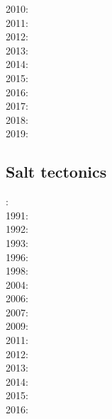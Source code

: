 2010: \cite{aubh10}\cite{gery10}\cite{fosr10}\cite{gerya2010}\\
2011: \cite{alht11}\cite{ellw11}\cite{hube11}\\
2012: \cite{alht12}\cite{brps12}\\
2013: \cite{alhf13}\cite{brau13}\cite{chbe13}\cite{knak13}\cite{kern13}\cite{mipf13}\cite{wabd13}
      \cite{gery13}\cite{ligw13}\cite{gery13c}\\
2014: \cite{hebr14}\cite{lige14}\cite{brun14}\cite{kobf14}\cite{ebva14}\cite{puge14}\cite{lige14b}
      \cite{hube14}\\
2015: \cite{nabu15}\cite{clbq15}\cite{huyb15}\cite{shmj15}\\
2016: \cite{olbm16}\cite{jekm16}\cite{zwsn16}\\
2017: \cite{lemh17}\cite{brcr17}\cite{bekb17}\cite{nabp17}\\
2018: \cite{chsm18}\cite{brwm18}\cite{brun18}\cite{tebu18}\cite{jebu18}\cite{sahf18}\cite{pesn18}
      \cite{mord18}\\
2019: \cite{lisp19}\cite{zwsb19}\cite{anpa19}\cite{dual19}\cite{mocb19}

\subsection*{Salt tectonics}

: \cite{woid78}\\
1991: \cite{tars91}\\
1992: \cite{zaju92}\\
1993: \cite{nabr93}\cite{vasv93}\cite{wejv93}\\
1996: \cite{maar96}\\
1998: \cite{giju98}\\
2004: \cite{istt04}\cite{geim04}\\
2006: \cite{maqs07}\\
2007: \cite{huja07}\cite{maqs07}\\
2009: \cite{grba09}\\
2011: \cite{brfo11}\\
2012: \cite{fejr12}\cite{liqi12}\\
2013: \cite{gobi13}\\
2014: \cite{bakp14}\cite{feka14a}\cite{feka14b}\cite{ghbu14}\cite{nifh14}\\
2015: \cite{feka15}\\
2016: \cite{masg16}

